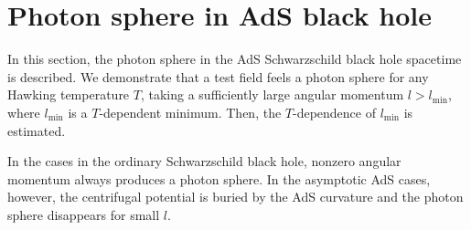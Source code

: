 \documentclass[a4paper,11pt]{article}
\begin{document}
\section{Photon sphere in AdS black hole}
\label{sec:2}
In this section, the photon sphere in the AdS Schwarzschild black hole spacetime is described.
We demonstrate that a test field feels a photon sphere for any Hawking temperature $T$, taking a sufficiently large angular momentum $l>l_\mathrm{min}$, where $l_\mathrm{min}$ is a $T$-dependent minimum.
Then, the $T$-dependence of $l_\mathrm{min}$ is estimated.

In the cases in the ordinary Schwarzschild black hole, nonzero angular momentum always produces a photon sphere.
In the asymptotic AdS cases, however, the centrifugal potential is buried by the AdS curvature and the photon sphere disappears for small $l$.
\end{document}
